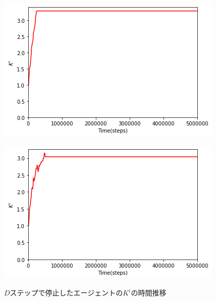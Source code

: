 \documentclass[12pt,a4j,twoside]{jarticle}
\begin{document}
  \begin{figure}
    \begin{minipage}{0.48\hsize}
      \centering
      \includegraphics[width=0.99\hsize]{figures/CorrectionTransition_CountStop_18.png}
      \label{subfig:transition_18}
    \end{minipage}
    \hfill
    \begin{minipage}{0.48\hsize}
      \centering
      \includegraphics[width=0.99\hsize]{figures/CorrectionTransition_CountStop_7.png}
      \label{subfig:transition_7}
    \end{minipage}
    \caption{$D$ステップで停止したエージェントの$K^i$の時間推移}
    \label{fig:transition_early}
  \vspace{12pt}
    \begin{minipage}{0.48\hsize}
      \centering

\end{minipage}
\end{figure}
\end{document}
